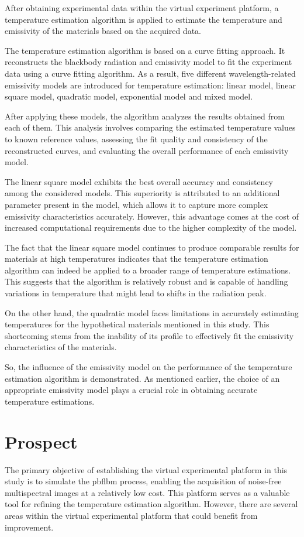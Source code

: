 After obtaining experimental data within the virtual experiment platform, a temperature estimation 
algorithm is applied to estimate the temperature and emissivity of the materials based on the 
acquired data.


The temperature estimation algorithm is based on a curve fitting approach. It reconstructs 
the blackbody radiation and emissivity model to fit the experiment data using a curve fitting 
algorithm. As a result, five different wavelength-related emissivity models are introduced for temperature 
estimation: linear model, linear square model, quadratic model, exponential model and mixed model. 


After applying these models, the algorithm analyzes the results obtained from each of them. 
This analysis involves comparing the estimated temperature values to known reference values, 
assessing the fit quality and consistency of the reconstructed curves, and evaluating the overall performance 
of each emissivity model.


The linear square model exhibits the best overall accuracy and consistency among the considered 
models. This superiority is attributed to an additional parameter present in the model, 
which allows it to capture more complex emissivity characteristics accurately. However, 
this advantage comes at the cost of increased computational requirements due to the higher 
complexity of the model.


The fact that the linear square model continues to produce comparable results for 
materials at high temperatures indicates that the temperature estimation algorithm can 
indeed be applied to a broader range of temperature estimations. This suggests that the 
algorithm is relatively robust and is capable of handling variations in temperature that 
might lead to shifts in the radiation peak.


On the other hand, the quadratic model faces limitations in accurately estimating 
temperatures for the hypothetical materials mentioned in this study. This shortcoming stems 
from the inability of its profile to effectively fit the emissivity characteristics of the materials.


So, the influence of the emissivity model on the performance of the temperature 
estimation algorithm is demonstrated. As mentioned earlier, the choice of an appropriate 
emissivity model plays a crucial role in obtaining accurate temperature estimations.

\newpage
\section*{Prospect}
The primary objective of establishing the virtual experimental platform in this study is to 
simulate the \gls{pbflbm} process, enabling the acquisition of noise-free multispectral 
images at a relatively low cost. This platform serves as a valuable tool for refining 
the temperature estimation algorithm. However, there are several areas within the virtual 
experimental platform that could benefit from improvement.


